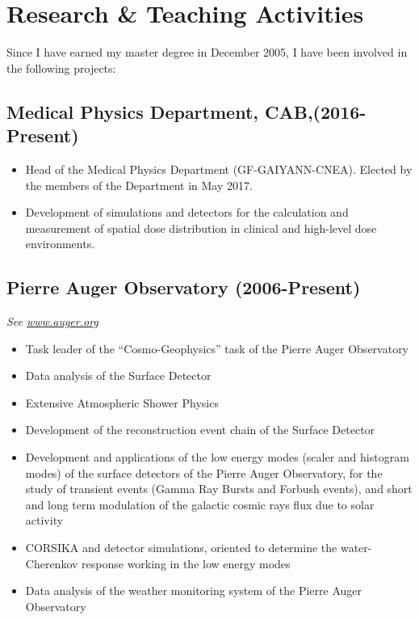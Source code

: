 \ifeng
\section*{Research \& Teaching Activities}

Since I have earned my master degree in December 2005, I have been involved in the following projects:

\subsection*{Medical Physics Department, CAB,(2016-Present)}
\begin{itemize}
	\item Head of the Medical Physics Department (GF-GAIYANN-CNEA). Elected by
		the members of the Department in May 2017.
	\item Development of simulations and detectors for the calculation and
		measurement of spatial dose distribution in clinical and high-level
		dose environments. 
\end{itemize}

\subsection*{Pierre Auger Observatory (2006-Present)}
{\small{\textit{See \href{http://www.auger.org/}{www.auger.org}}}}
\begin{itemize}
\item Task leader of the ``Cosmo-Geophysics'' task of the Pierre Auger Observatory
\item Data analysis of the Surface Detector
\item Extensive Atmospheric Shower Physics
\item Development of the reconstruction event chain of the Surface Detector
\item Development and applications of the low energy modes (scaler and histogram
modes) of the surface detectors of the Pierre Auger Observatory, for the study
of transient events (Gamma Ray Bursts and Forbush events), and short and long
term modulation of the galactic cosmic rays flux due to solar activity
\item CORSIKA and detector simulations, oriented to determine the
water-Cherenkov response working in the low energy modes
\item Data analysis of the weather monitoring system of the Pierre Auger
Observatory
\end{itemize}

